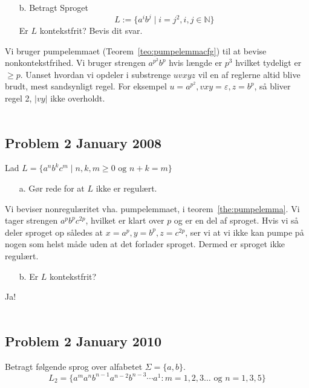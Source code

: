 \begin{enumerate}
	\item[b.] Betragt Sproget \[L := \{a^{i}b^{j} \mid i=j^{2}, i, j \in \mathbb{N}\}\] Er $L$ kontekstfrit? Bevis dit svar.
\end{enumerate}

Vi bruger pumpelemmaet (Teorem~\ref{teo:pumpelemmacfg}) til at bevise nonkontekstfrihed.
Vi bruger strengen $a^{p^{2}}b^{p}$ hvis længde er $p^{3}$ hvilket tydeligt er $\ge p$. Uanset hvordan vi opdeler i substrenge $uvxyz$ vil en af reglerne altid blive brudt, mest sandsynligt regel. For eksempel $u = a^{p^{2}}, vxy = \varepsilon, z = b^{p}$, så bliver regel 2, $|vy|$ ikke overholdt.
\\\\


\noindent
\subsection*{Problem 2 January 2008}
\noindent
Lad $L = \{a^{n}b^{k}c^{m} \mid n,k,m \ge 0 \text{ og } n+k = m\}$

\begin{enumerate}
	\item[a.] Gør rede for at $L$ ikke er regulært.
\end{enumerate}

Vi beviser nonregulæritet vha. pumpelemmaet, i teorem~\ref{the:pumpelemma}. Vi tager strengen $a^{p}b^{p}c^{2p}$, hvilket er klart over $p$ og er en del af sproget. Hvis vi så deler sproget op således at $x = a^{p}, y = b^{p}, z = c^{2p}$, ser vi at vi ikke kan pumpe på nogen som helst måde uden at det forlader sproget. Dermed er sproget ikke regulært.

\begin{enumerate}
	\item[b.] Er $L$ kontekstfrit?
\end{enumerate}



Ja!\\\\

\noindent
\subsection*{Problem 2 January 2010}
\noindent

Betragt følgende sprog over alfabetet $\Sigma = \{a,b\}$.
\[L_{2}= \{a^{m}a^{n}b^{n-1}a^{n-2}b^{n-3} \cdots a^{1} : m = 1,2,3 \ldots \text{ og } n = 1,3,5 \}\]

